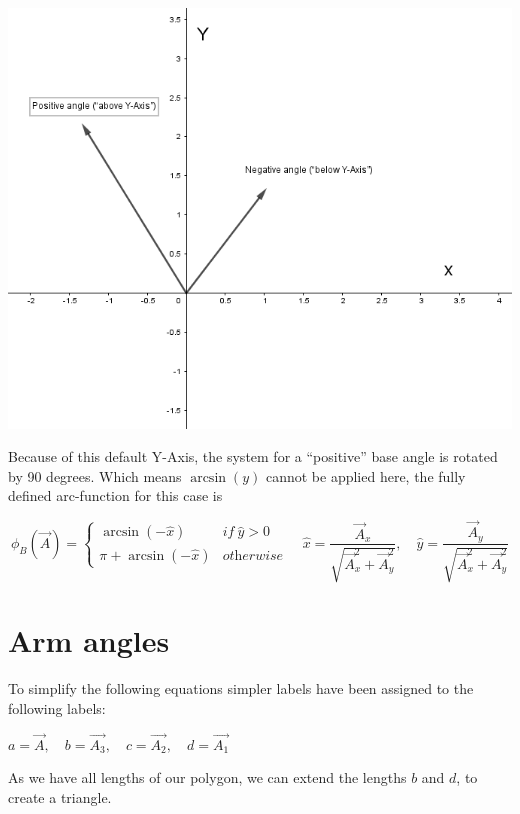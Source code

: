 \documentclass{article}
\begin{document}
    \includegraphics[scale=0.4]{images/ArcSin_Problem.PNG}
    
    Because of this default Y-Axis, the system for a “positive” base angle is rotated by 90 degrees. Which means $\arcsin(y) $ cannot be applied here, the fully defined arc-function for this case is
    
    \begin{equation}
        \phi_B(\vec{A}) =\left\{
        \begin{array}{cc}
            \arcsin(-\hat{x}) & \textit{if}\ \hat{y} > 0 \ \\
            \pi + \arcsin(-\hat{x}) & \textit{otherwise}
        \end{array}\right. \quad
        \hat{x} = \frac{\vec{A}_x}{\sqrt{\vec{A}_x^2 + \vec{A}_y^2}}, \quad
        \hat{y} = \frac{\vec{A}_y}{\sqrt{\vec{A}_x^2 + \vec{A}_y^2}}
    \end{equation}
    
\section{Arm angles}
    To simplify the following equations simpler labels have been assigned to the following labels: 
    
    $a = \vec{A}, \quad b = \vec{A_3}, \quad c = \vec{A_2}, \quad d = \vec{A_1}$ 
    
    As we have all lengths of our polygon, we can extend the lengths $b$ and $d$, to create a triangle.
    
\end{document}
